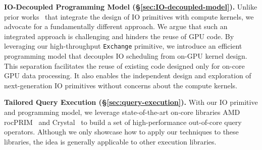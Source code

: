 \noindent
\textbf{IO-Decoupled Programming Model (\S\ref{sec:IO-decoupled-model}). }
Unlike prior works~\cite{triton-join, pump-up-volume, gowan-ipdpsw-2018, sioulas-icde-2019, rui-vldb2020} that integrate the design of IO primitives with compute kernels, we advocate for a fundamentally different approach.
We argue that such an integrated approach is challenging and hinders the reuse of GPU code. 
By leveraging our high-throughput \texttt{Exchange} primitive, we introduce an efficient programming model that decouples IO scheduling from on-GPU kernel design. 
This separation facilitates the reuse of existing code designed only for on-core GPU data processing. It also enables the independent design and exploration of next-generation IO primitives without concerns about the compute kernels.

\begin{comment}
\textbf{IO-decoupled Programming Model (\S~\ref{sec:IO-decoupled-model}). }
Limited by the IO bandwidth, prior works~\cite{triton-join, pump-up-volume, gowan-ipdpsw-2018, sioulas-icde-2019, rui-vldb2020} have to co-design the IO patterns and compute kernels.
We argue that designing these two together is challenging, and prevents reusing existing GPU code.
Taking advantage of our high-throughput \texttt{Exchange} primitive, we propose an efficient programming model that separates the concern of IO scheduling and on-GPU kernel design and enables reusing code not designed for out-of-core GPU data processing.
\end{comment}





\noindent
\textbf{Tailored Query Execution (\S\ref{sec:query-execution}).}
With our IO primitive and programming model, we leverage state-of-the-art on-core libraries AMD rocPRIM~\cite{rocprim} and Crystal~\cite{crystal-sigmod-20} to build a set of high-performance out-of-core query operators.
Although we only showcase how to apply our techniques to these libraries, the idea is generally applicable to other execution libraries.

